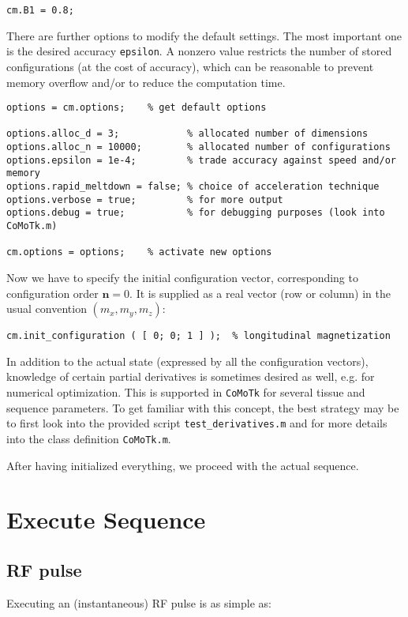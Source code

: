 \documentclass[a4paper,10pt]{article}
\begin{document}
\begin{verbatim}
cm.B1 = 0.8;
\end{verbatim}

There are further options to modify the default settings. The most important
one is the desired accuracy \texttt{epsilon}. A nonzero value restricts the number of stored
configurations (at the cost of accuracy), which can be reasonable to prevent memory overflow and/or to reduce the computation 
time.

\begin{verbatim}
options = cm.options;    % get default options

options.alloc_d = 3;            % allocated number of dimensions
options.alloc_n = 10000;        % allocated number of configurations
options.epsilon = 1e-4;         % trade accuracy against speed and/or memory
options.rapid_meltdown = false; % choice of acceleration technique
options.verbose = true;         % for more output
options.debug = true;           % for debugging purposes (look into CoMoTk.m)

cm.options = options;    % activate new options
\end{verbatim}

Now we have to specify the initial configuration vector, corresponding to configuration order \(\bm{n} = 0\). 
It is supplied as a real vector (row or column) in the usual convention \(\left( m_x, m_y, m_z \right)\):

\begin{verbatim}
cm.init_configuration ( [ 0; 0; 1 ] );  % longitudinal magnetization
\end{verbatim}

In addition to the actual state (expressed by all the configuration vectors), knowledge of certain partial derivatives 
is sometimes desired as well, e.g. for numerical optimization.
This is supported in \texttt{CoMoTk} for several tissue and sequence parameters. 
To get familiar with this concept, the best strategy may be to first look into the provided script \texttt{test\_derivatives.m} and
for more details into the class definition \texttt{CoMoTk.m}.

After having initialized everything, we proceed with the actual sequence. 

\section{Execute Sequence}
\label{sec:org4ffa444}

\subsection{RF pulse}
\label{sec:orgc87c325}
Executing an (instantaneous) RF pulse is as simple as:
\end{document}
